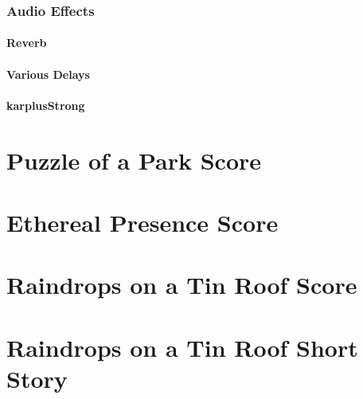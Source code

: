 \subsection{Audio Effects}

\subsubsection{Reverb}
\vspace{5mm}

\subsubsection{Various Delays}
\vspace{5mm}

\subsubsection{karplusStrong}
\vspace{5mm}



\chapter{Puzzle of a Park Score}



\chapter{Ethereal Presence Score}



\chapter{Raindrops on a Tin Roof Score}

 

\chapter{Raindrops on a Tin Roof Short Story}







